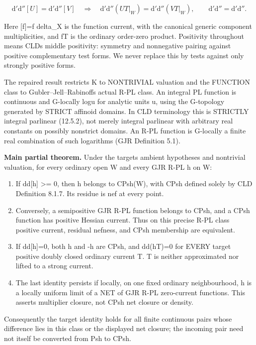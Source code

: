 \documentclass[
  11pt,
]{article}
\providecommand{\tightlist}{%
  \setlength{\itemsep}{0pt}\setlength{\parskip}{0pt}}
\newcommand{\ddc}{\mathrm d'\mathrm d''}
\begin{document}
\[
\ddc[U]=\ddc[V]\quad\Longrightarrow\quad \ddc(UT|_W)=\ddc(VT|_W),\qquad\ddc=\mathrm d'\mathrm d''.
\]

Here {[}f{]}=f delta\_X is the function current, with the canonical
generic component multiplicities, and fT is the ordinary order-zero
product. Positivity throughout means CLD\textquotesingle s middle
positivity: symmetry and nonnegative pairing against positive
complementary test forms. We never replace this by tests against only
strongly positive forms.

The repaired result restricts K to NONTRIVIAL valuation and the FUNCTION
class to Gubler--Jell--Rabinoff\textquotesingle s actual R-PL class. An
integral PL function is continuous and G-locally log\textbar u\textbar{}
for analytic units u, using the G-topology generated by STRICT affinoid
domains. In CLD terminology this is STRICTLY integral parlinear
(12.5.2), not merely integral parlinear with arbitrary real constants on
possibly nonstrict domains. An R-PL function is G-locally a finite real
combination of such logarithms (GJR Definition 5.1).

\textbf{Main partial theorem.} Under the target\textquotesingle s
ambient hypotheses and nontrivial valuation, for every ordinary open W
and every GJR R-PL h on W:

\begin{enumerate}
\def\labelenumi{\arabic{enumi}.}
\tightlist
\item
  If dd{[}h{]} \textgreater= 0, then h belongs to CPsh(W), with CPsh
  defined solely by CLD Definition 8.1.7. Its residue is nef at every
  point.
\item
  Conversely, a semipositive GJR R-PL function belongs to CPsh, and a
  CPsh function has positive Hessian current. Thus on this precise R-PL
  class positive current, residual nefness, and CPsh membership are
  equivalent.
\item
  If dd{[}h{]}=0, both h and -h are CPsh, and dd(hT)=0 for EVERY target
  positive doubly closed ordinary current T. T is neither approximated
  nor lifted to a strong current.
\item
  The last identity persists if locally, on one fixed ordinary
  neighbourhood, h is a locally uniform limit of a NET of GJR R-PL
  zero-current functions. This asserts multiplier closure, not CPsh net
  closure or density.
\end{enumerate}

Consequently the target identity holds for all finite continuous pairs
whose difference lies in this class or the displayed net closure; the
incoming pair need not itself be converted from Psh to CPsh.
\end{document}
